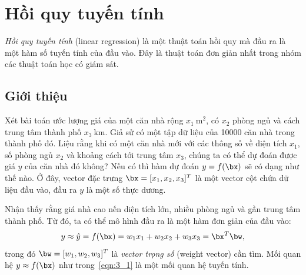 \chapter{Hồi quy tuyến tính}
\label{cha:linear_regression}

\textit{Hồi quy tuyến tính} (linear regression) là một thuật toán hồi quy mà đầu ra là một hàm số tuyến tính của đầu vào. Đây là thuật toán đơn giản nhất trong nhóm các thuật toán học có giám sát. 
\section{Giới thiệu} 
Xét bài toán ước lượng giá của một căn nhà rộng $x_1 ~ \text{m}^2$, có $x_2$
phòng ngủ và cách trung tâm thành phố $x_3~ \text{km}$. Giả sử có một tập dữ liệu của 10000 căn nhà trong thành phố đó. Liệu rằng khi có một căn nhà
mới với các thông số về diện tích $x_1$, số phòng ngủ $x_2$ và khoảng cách tới
trung tâm $x_3$, chúng ta có thể dự đoán được giá $y$ của căn nhà đó không? Nếu
có thì hàm dự đoán $y = f(\bx)$ sẽ có dạng như thế nào. Ở đây, vector đặc
trưng $\bx = [x_1, x_2, x_3]^T$ là một vector cột chứa dữ liệu đầu vào,
đầu ra $y$ là một số thực dương.

Nhận thấy rằng giá nhà cao nến diện tích lớn, nhiều phòng ngủ và gần trung tâm thành phố. Từ đó, ta có thể mô hình đầu ra là một hàm đơn giản của đầu vào:
\begin{equation}
\label{eqn:3_1}
y \approx \hat{y} = f(\bx) = w_1 x_1 + w_2 x_2 + w_3 x_3 = \bx^T\bw,
\end{equation}
trong đó $\bw = [w_1, w_2, w_3]^T$ là \textit{vector trọng số} (weight vector) cần tìm. Mối quan hệ $y \approx f(\bx)$ như trong~\eqref{eqn:3_1} là một mối quan hệ tuyến tính.


